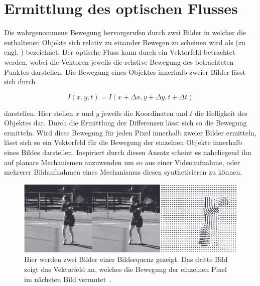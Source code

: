 
\chapter{Ermittlung des optischen Flusses}


Die wahrgenommene Bewegung hervorgerufen durch zwei Bilder in welcher die enthaltenen Objekte sich relativ zu einander Bewegen zu scheinen wird als (zu engl. ) bezeichnet. %
Der optische Fluss kann durch ein Vektorfeld betrachtet werden, wobei die Vektoren jeweils die relative Bewegung des betrachteten Punktes darstellen.
Die Bewegung eines Objektes innerhalb zweier Bilder lässt sich durch

\begin{equation}
I(x, y, t) = I(x + \Delta x, y + \Delta y, t + \Delta t)
\label{eq:optical_flow}
\end{equation}

darstellen.
Hier stellen $x$ und $y$ jeweils die Koordinaten und $t$ die Helligkeit des Objektes dar.
Durch die Ermittlung der Differenzen lässt sich so die Bewegung ermitteln.
Wird diese Bewegung für jeden Pixel innerhalb zweier Bilder ermitteln, lässt sich so ein Vektorfeld für die Bewegung der einzelnen Objekte innerhalb eines Bildes darstellen.
Inspiriert durch diesen Ansatz scheint es naheliegend ihn auf planare Mechanismen anzuwenden um so aus einer Videoaufnahme, oder mehrerer Bildaufnahmen eines Mechanismus diesen synthetisieren zu können.

\begin{figure}
    \centering
    \includegraphics[width=\textwidth]{gfx/ai_modern_approach_optical_flow.png}
    \caption[Vektorfelder durch optischen Fluss]{Hier werden zwei Bilder einer Bildsequenz gezeigt. Das dritte Bild zeigt das Vektorfeld an, welches die Bewegung der einzelnen Pixel im nächsten Bild vermutet~\cite[[S.~941]{Russell2010, Brox2009}.}
    \label{fig:ai_modern_approach_optical_flow}
\end{figure}

